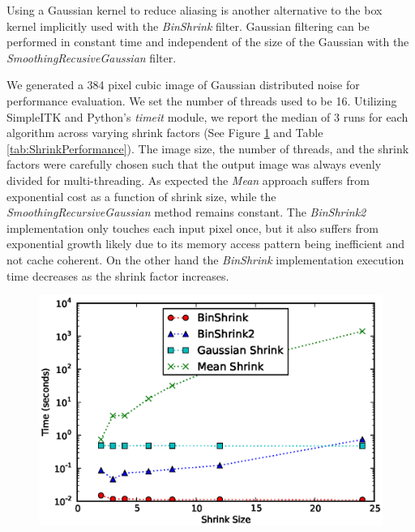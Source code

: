 \documentclass{InsightArticle}
\begin{document}
Using a Gaussian kernel to reduce aliasing is another alternative to the box
kernel implicitly used with the \textit{BinShrink} filter. Gaussian filtering can be
performed in constant time and independent of the size of the Gaussian with
the \textit{SmoothingRecusiveGaussian} filter.

We generated a 384 pixel cubic image of Gaussian distributed noise for
performance evaluation. We set the number of threads used to be
16. Utilizing SimpleITK and Python's
\textit{timeit} module, we report the median of 3 runs for each
algorithm across varying shrink factors (See Figure
\ref{fig:ShrinkPerformance} and Table \ref{tab:ShrinkPerformance}).  The image size, the number of threads,
and the shrink factors were carefully chosen such that the output
image was always evenly divided for multi-threading. As expected the
\textit{Mean} approach suffers from exponential cost as a function of
shrink size, while the
\textit{SmoothingRecursiveGaussian} method remains constant. The
\textit{BinShrink2} implementation only touches each input pixel once,
but it also suffers from exponential growth likely due to its memory
access pattern being inefficient and not cache coherent. On the other
hand the \textit{BinShrink} implementation execution time decreases as
the shrink factor increases.

\begin{figure}
  \centering
  \includegraphics[width=0.8\linewidth]{images/shrink_time}
  \label{fig:ShrinkPerformance}
\end{figure}
\end{document}
